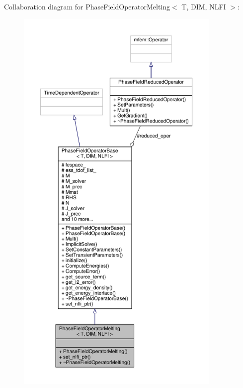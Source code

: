 Collaboration diagram for Phase\+Field\+Operator\+Melting$<$ T, D\+IM, N\+L\+FI $>$\+:\nopagebreak
\begin{figure}[H]
\begin{center}
\leavevmode
\includegraphics[height=550pt]{classPhaseFieldOperatorMelting__coll__graph}
\end{center}
\end{figure}
